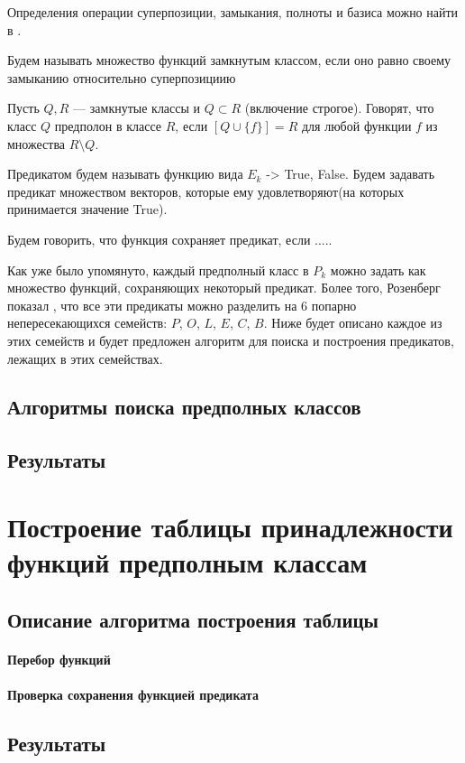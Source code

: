 \documentclass[a4paper,14pt]{extreport}
\begin{document}
Определения операции суперпозиции, замыкания, полноты и базиса можно найти в \cite{march}.

Будем называть множество функций замкнутым классом, если оно равно своему замыканию относительно суперпозициию

Пусть $Q, R$ — замкнутые классы и $Q \subset R$ (включение строгое). 
Говорят, что класс $Q$ предполон в классе $R$, если $[Q \cup \{f\}] = R$ для 
любой функции $f$ из множества $R \setminus Q$. 

Предикатом будем называть функцию вида $E_k$ -> {True, False}. Будем задавать предикат множеством векторов, которые ему удовлетворяют(на которых принимается значение True).

Будем говорить, что функция сохраняет предикат, если .....

Как уже было упомянуто, каждый предполный класс в $P_k$ можно задать как множество функций, сохраняющих некоторый предикат. Более того, Розенберг показал \cite{roz1, roz2}, что все эти предикаты можно разделить на 6 попарно непересекающихся семейств: $P$, $O$, $L$, $E$, $C$, $B$. Ниже будет описано каждое из этих семейств и будет предложен алгоритм для поиска и построения предикатов, лежащих в этих семействах.

\section{Алгоритмы поиска предполных классов}
\section{Результаты}

\newpage
\chapter{Построение таблицы принадлежности функций предполным классам}
\section{Описание алгоритма построения таблицы}
\subsubsection{Перебор функций}
\subsubsection{Проверка сохранения функцией предиката}
\section{Результаты}
\end{document}
